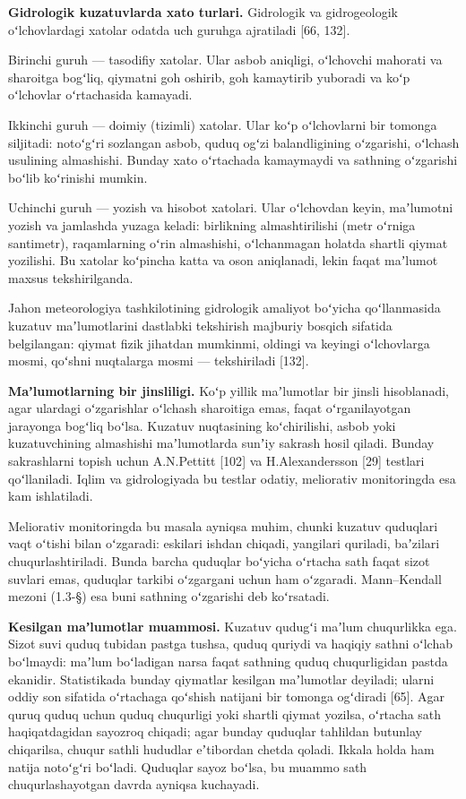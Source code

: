 \documentclass[14pt,a4paper,oneside]{extreport}
\begin{document}
\textbf{Gidrologik kuzatuvlarda xato turlari.} Gidrologik va
gidrogeologik oʻlchovlardagi xatolar odatda uch guruhga ajratiladi
{[}66, 132{]}.

Birinchi guruh --- tasodifiy xatolar. Ular asbob aniqligi, oʻlchovchi
mahorati va sharoitga bogʻliq, qiymatni goh oshirib, goh kamaytirib
yuboradi va koʻp oʻlchovlar oʻrtachasida kamayadi.

Ikkinchi guruh --- doimiy (tizimli) xatolar. Ular koʻp oʻlchovlarni bir
tomonga siljitadi: notoʻgʻri sozlangan asbob, quduq ogʻzi balandligining
oʻzgarishi, oʻlchash usulining almashishi. Bunday xato oʻrtachada
kamaymaydi va sathning oʻzgarishi boʻlib koʻrinishi mumkin.

Uchinchi guruh --- yozish va hisobot xatolari. Ular oʻlchovdan keyin,
maʼlumotni yozish va jamlashda yuzaga keladi: birlikning almashtirilishi
(metr oʻrniga santimetr), raqamlarning oʻrin almashishi, oʻlchanmagan
holatda shartli qiymat yozilishi. Bu xatolar koʻpincha katta va oson
aniqlanadi, lekin faqat maʼlumot maxsus tekshirilganda.

Jahon meteorologiya tashkilotining gidrologik amaliyot boʻyicha
qoʻllanmasida kuzatuv maʼlumotlarini dastlabki tekshirish majburiy
bosqich sifatida belgilangan: qiymat fizik jihatdan mumkinmi, oldingi va
keyingi oʻlchovlarga mosmi, qoʻshni nuqtalarga mosmi --- tekshiriladi
{[}132{]}.

\textbf{Maʼlumotlarning bir jinsliligi.} Koʻp yillik maʼlumotlar bir
jinsli hisoblanadi, agar ulardagi oʻzgarishlar oʻlchash sharoitiga emas,
faqat oʻrganilayotgan jarayonga bogʻliq boʻlsa. Kuzatuv nuqtasining
koʻchirilishi, asbob yoki kuzatuvchining almashishi maʼlumotlarda sunʼiy
sakrash hosil qiladi. Bunday sakrashlarni topish uchun A.N.Pettitt
{[}102{]} va H.Alexandersson {[}29{]} testlari qoʻllaniladi. Iqlim va
gidrologiyada bu testlar odatiy, meliorativ monitoringda esa kam
ishlatiladi.

Meliorativ monitoringda bu masala ayniqsa muhim, chunki kuzatuv
quduqlari vaqt oʻtishi bilan oʻzgaradi: eskilari ishdan chiqadi,
yangilari quriladi, baʼzilari chuqurlashtiriladi. Bunda barcha quduqlar
boʻyicha oʻrtacha sath faqat sizot suvlari emas, quduqlar tarkibi
oʻzgargani uchun ham oʻzgaradi. Mann--Kendall mezoni (1.3-§) esa buni
sathning oʻzgarishi deb koʻrsatadi.

\textbf{Kesilgan maʼlumotlar muammosi.} Kuzatuv qudugʻi maʼlum
chuqurlikka ega. Sizot suvi quduq tubidan pastga tushsa, quduq quriydi
va haqiqiy sathni oʻlchab boʻlmaydi: maʼlum boʻladigan narsa faqat
sathning quduq chuqurligidan pastda ekanidir. Statistikada bunday
qiymatlar kesilgan maʼlumotlar deyiladi; ularni oddiy son sifatida
oʻrtachaga qoʻshish natijani bir tomonga ogʻdiradi {[}65{]}. Agar quruq
quduq uchun quduq chuqurligi yoki shartli qiymat yozilsa, oʻrtacha sath
haqiqatdagidan sayozroq chiqadi; agar bunday quduqlar tahlildan butunlay
chiqarilsa, chuqur sathli hududlar eʼtibordan chetda qoladi. Ikkala
holda ham natija notoʻgʻri boʻladi. Quduqlar sayoz boʻlsa, bu muammo
sath chuqurlashayotgan davrda ayniqsa kuchayadi.
\end{document}
